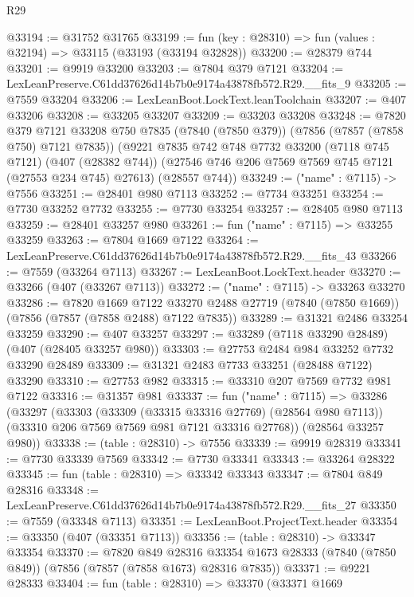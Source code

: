 \begin{lexlean}{R29}
\begin{coremodule}
@33194 := @31752 @31765
@33199 := fun (key : @28310) => fun (values : @32194) => @33115 (@33193 (@33194 @32828))
@33200 := @28379 @744
@33201 := @9919 @33200
@33203 := @7804 @379 @7121
@33204 := LexLeanPreserve.C61dd37626d14b7b0e9174a43878fb572.R29.__fits_9
@33205 := @7559 @33204
@33206 := LexLeanBoot.LockText.leanToolchain
@33207 := @407 @33206
@33208 := @33205 @33207
@33209 := @33203 @33208
@33248 := @7820
    @379
    @7121
    @33208
    @750
    @7835
    (@7840 (@7850 @379))
    (@7856 (@7857 (@7858 @750) @7121 @7835))
    (@9221
      @7835
      @742
      @748
      @7732
      @33200
      (@7118 @745 @7121)
      (@407 (@28382 @744))
      (@27546 @746 @206 @7569 @7569 @745 @7121 (@27553 @234 @745) @27613)
      (@28557 @744))
@33249 := ("name" : @7115) -> @7556
@33251 := @28401 @980 @7113
@33252 := @7734 @33251
@33254 := @7730 @33252 @7732
@33255 := @7730 @33254
@33257 := @28405 @980 @7113
@33259 := @28401 @33257 @980
@33261 := fun ("name" : @7115) => @33255 @33259
@33263 := @7804 @1669 @7122
@33264 := LexLeanPreserve.C61dd37626d14b7b0e9174a43878fb572.R29.__fits_43
@33266 := @7559 (@33264 @7113)
@33267 := LexLeanBoot.LockText.header
@33270 := @33266 (@407 (@33267 @7113))
@33272 := ("name" : @7115) -> @33263 @33270
@33286 := @7820
    @1669
    @7122
    @33270
    @2488
    @27719
    (@7840 (@7850 @1669))
    (@7856 (@7857 (@7858 @2488) @7122 @7835))
@33289 := @31321 @2486 @33254 @33259
@33290 := @407 @33257
@33297 := @33289 (@7118 @33290 @28489) (@407 (@28405 @33257 @980))
@33303 := @27753 @2484 @984 @33252 @7732 @33290 @28489
@33309 := @31321 @2483 @7733 @33251 (@28488 @7122) @33290
@33310 := @27753 @982
@33315 := @33310 @207 @7569 @7732 @981 @7122
@33316 := @31357 @981
@33337 := fun ("name" : @7115) =>
  @33286
    (@33297
      (@33303
        (@33309 (@33315 @33316 @27769) (@28564 @980 @7113))
        (@33310 @206 @7569 @7569 @981 @7121 @33316 @27768))
      (@28564 @33257 @980))
@33338 := (table : @28310) -> @7556
@33339 := @9919 @28319
@33341 := @7730 @33339 @7569
@33342 := @7730 @33341
@33343 := @33264 @28322
@33345 := fun (table : @28310) => @33342 @33343
@33347 := @7804 @849 @28316
@33348 := LexLeanPreserve.C61dd37626d14b7b0e9174a43878fb572.R29.__fits_27
@33350 := @7559 (@33348 @7113)
@33351 := LexLeanBoot.ProjectText.header
@33354 := @33350 (@407 (@33351 @7113))
@33356 := (table : @28310) -> @33347 @33354
@33370 := @7820
    @849
    @28316
    @33354
    @1673
    @28333
    (@7840 (@7850 @849))
    (@7856 (@7857 (@7858 @1673) @28316 @7835))
@33371 := @9221 @28333
@33404 := fun (table : @28310) =>
  @33370
    (@33371
      @1669

\end{coremodule}
\end{lexlean}
